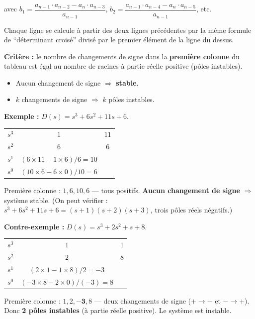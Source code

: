 \documentclass[12pt,a4paper,twoside]{book}
\begin{document}
avec $b_1 = \dfrac{a_{n-1}\cdot a_{n-2} - a_n\cdot a_{n-3}}{a_{n-1}}$, \quad $b_2 = \dfrac{a_{n-1}\cdot a_{n-4} - a_n\cdot a_{n-5}}{a_{n-1}}$, \quad etc.

Chaque ligne se calcule à partir des deux lignes précédentes par la même formule de ``déterminant croisé'' divisé par le premier élément de la ligne du dessus.

\begin{formule}
\textbf{Critère :} le nombre de changements de signe dans la \textbf{première colonne} du tableau est égal au nombre de racines à partie réelle positive (pôles instables).
\begin{itemize}[nosep]
\item Aucun changement de signe $\Rightarrow$ \textbf{stable}.
\item $k$ changements de signe $\Rightarrow$ $k$ pôles instables.
\end{itemize}
\end{formule}

\textbf{Exemple :} $D(s) = s^3 + 6s^2 + 11s + 6$.

\begin{center}
\begin{tabular}{c|cc}
$s^3$ & $1$ & $11$ \\
$s^2$ & $6$ & $6$ \\
$s^1$ & $(6\times11 - 1\times6)/6 = 10$ & \\
$s^0$ & $(10\times6 - 6\times0)/10 = 6$ & \\
\end{tabular}
\end{center}

Première colonne : $1, 6, 10, 6$ --- tous positifs. \textbf{Aucun changement de signe} $\Rightarrow$ système stable. (On peut vérifier : $s^3+6s^2+11s+6 = (s+1)(s+2)(s+3)$, trois pôles réels négatifs.)

\textbf{Contre-exemple :} $D(s) = s^3 + 2s^2 + s + 8$.

\begin{center}
\begin{tabular}{c|cc}
$s^3$ & $1$ & $1$ \\
$s^2$ & $2$ & $8$ \\
$s^1$ & $(2\times1 - 1\times8)/2 = -3$ & \\
$s^0$ & $(-3\times8 - 2\times0)/(-3) = 8$ & \\
\end{tabular}
\end{center}

Première colonne : $1, 2, \mathbf{-3}, 8$ --- deux changements de signe ($+\to-$ et $-\to+$). Donc \textbf{2 pôles instables} (à partie réelle positive). Le système est instable.
\end{document}
